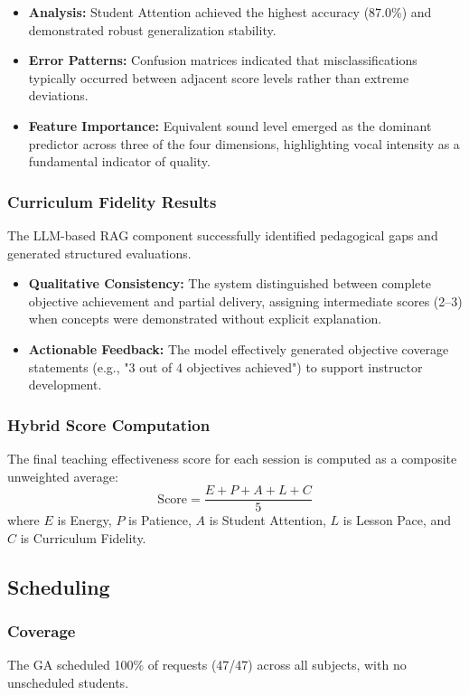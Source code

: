 \begin{itemize}
    \item \textbf{Analysis:} Student Attention achieved the highest accuracy (87.0\%) and demonstrated robust generalization stability.
    \item \textbf{Error Patterns:} Confusion matrices indicated that misclassifications typically occurred between adjacent score levels rather than extreme deviations.
    \item \textbf{Feature Importance:} Equivalent sound level emerged as the dominant predictor across three of the four dimensions, highlighting vocal intensity as a fundamental indicator of quality.
\end{itemize}

\subsubsection{Curriculum Fidelity Results}
The LLM-based RAG component successfully identified pedagogical gaps and generated structured evaluations.
\begin{itemize}
    \item \textbf{Qualitative Consistency:} The system distinguished between complete objective achievement and partial delivery, assigning intermediate scores (2–3) when concepts were demonstrated without explicit explanation.
    \item \textbf{Actionable Feedback:} The model effectively generated objective coverage statements (e.g., "3 out of 4 objectives achieved") to support instructor development.
\end{itemize}

\subsubsection{Hybrid Score Computation}
The final teaching effectiveness score for each session is computed as a composite unweighted average:
\begin{equation}
    \mathrm{Score} = \frac{E+P+A+L+C}{5}
\end{equation}
where $E$ is Energy, $P$ is Patience, $A$ is Student Attention, $L$ is Lesson Pace, and $C$ is Curriculum Fidelity.

\subsection{Scheduling}

\subsubsection{Coverage}
The GA scheduled 100\% of requests (47/47) across all subjects, with no unscheduled students.    

